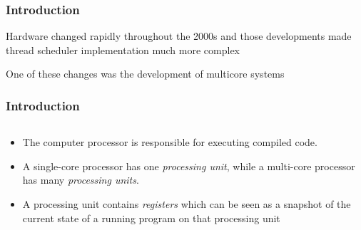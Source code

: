 \documentclass{beamer}
\newcommand{\linespace}{\vskip 0.25cm}
\begin{document}
\begin{frame}
\frametitle{Introduction}

Hardware changed rapidly throughout the 2000s and those developments made thread scheduler implementation much more complex

\linespace

One of these changes was the development of multicore systems

\end{frame}


\begin{frame}
\frametitle{Introduction}


\begin{columns}
	\begin{column}{0.78\textwidth}

		\begin{itemize}
		\item The computer processor is responsible for executing compiled code.

		\item A single-core processor has one \emph{processing unit}, while a multi-core processor has many \emph{processing units}.

		\item A processing unit contains \emph{registers} which can be seen as a snapshot of the current state of a running program on that processing unit


\end{itemize}
\end{column}
\end{columns}
\end{frame}
\end{document}
